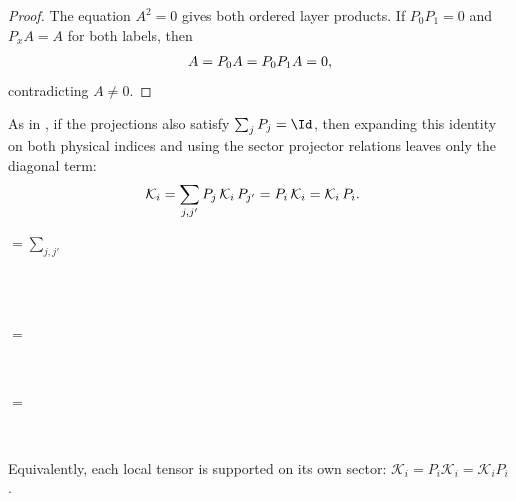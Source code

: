 \begin{proof}
    \leanok
    The equation $A^2=0$ gives both ordered layer products. If $P_0P_1=0$
    and $P_xA=A$ for both labels, then
    \begin{align}
        A=P_0A=P_0P_1A=0,
        \notag
    \end{align}
    contradicting $A\ne0$.
\end{proof}

As in \cite[Appendix~C.2, lines~1745--1751]{Cirac2016MPDO_arXiv},
if the projections also satisfy $\sum_jP_j=\Id$, then expanding this
identity on both physical indices and using the sector projector relations
leaves only the diagonal term:
\begin{align}
    \mathcal K_i
     & =\sum_{j,j'}P_j\,\mathcal K_i\,P_{j'}
    =P_i\,\mathcal K_i
    =\mathcal K_i\,P_i. \notag
\end{align}
\begin{center}
    \tenkzkernel
    \begin{tenkz}[rows={wire}, cols=1, west=open, east=open, physical=updown]
    \end{tenkz}
    $ = \sum_{j,j'}$
    \begin{tenkz}[rows={op,op,op}, cols=1, west=none, east=none, physical=updown]
         \\
         \\
    \end{tenkz}
    $ = $
    \begin{tenkz}[rows={op,op}, cols=1, west=none, east=none, physical=updown]
         \\
    \end{tenkz}
    $ = $
    \begin{tenkz}[rows={op,op}, cols=1, west=none, east=none, physical=updown]
         \\
    \end{tenkz}
\end{center}
Equivalently, each local tensor is supported on its own sector:
$\mathcal K_i=P_i\mathcal K_i=\mathcal K_iP_i$.

